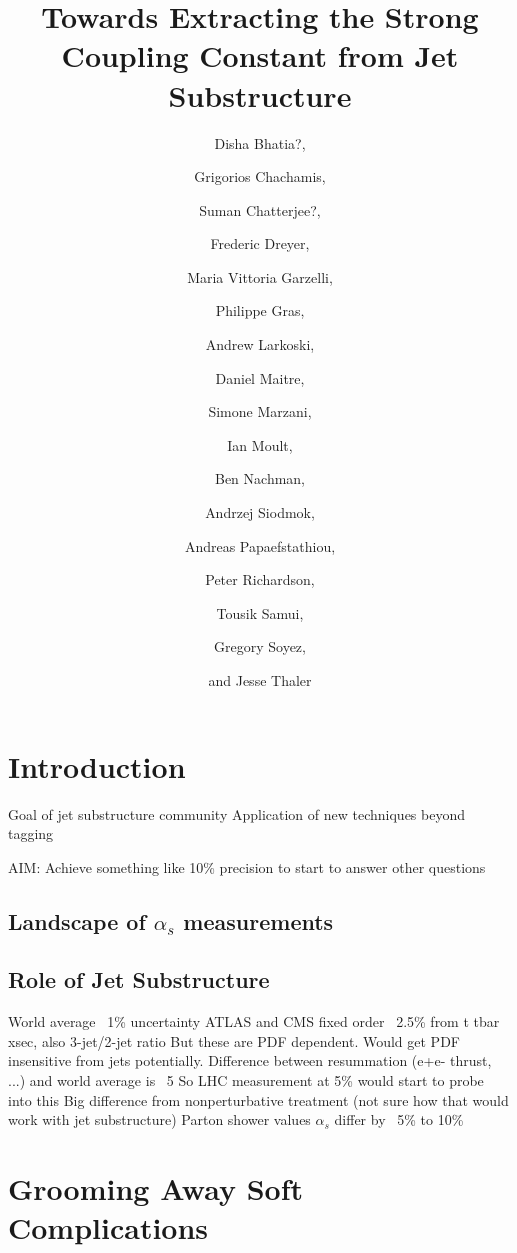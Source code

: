 \documentclass[11pt,letterpaper]{article}
\begin{document}
\title{Towards Extracting the Strong Coupling Constant from Jet Substructure }

\author[a]{Disha Bhatia?,}
\author[a]{Grigorios Chachamis,}
\author[a]{Suman Chatterjee?,}
\author[a]{Frederic Dreyer,}
\author[a]{Maria Vittoria Garzelli,}
\author[a]{Philippe Gras,}
\author[a]{Andrew Larkoski,}
\author[a]{Daniel Maitre,}
\author[a]{Simone Marzani, }
\author[a]{Ian Moult,}
\author[a]{Ben Nachman,}
\author[a]{Andrzej Siodmok,}
\author[a]{Andreas Papaefstathiou,}
\author[a]{Peter Richardson,}
\author[a]{Tousik Samui,}
\author[a]{Gregory Soyez,}
\author[a]{and Jesse Thaler}



\maketitle

\section{Introduction}

Goal of jet substructure community
Application of new techniques beyond tagging

AIM:  Achieve something like 10\% precision to start to answer other questions

\subsection{Landscape of $\alpha_s$ measurements}

\subsection{Role of Jet Substructure}

World average ~1\% uncertainty
ATLAS and CMS fixed order ~2.5\% from t tbar xsec, also 3-jet/2-jet ratio
	But these are PDF dependent.
	Would get PDF insensitive from jets potentially.
Difference between resummation (e+e- thrust, ...) and world average is ~5%
	So LHC measurement at 5\% would start to probe into this
	Big difference from nonperturbative treatment
	(not sure how that would work with jet substructure)
Parton shower values $\alpha_s$ differ by ~5\% to 10\%

\section{Grooming Away Soft Complications}
\end{document}
